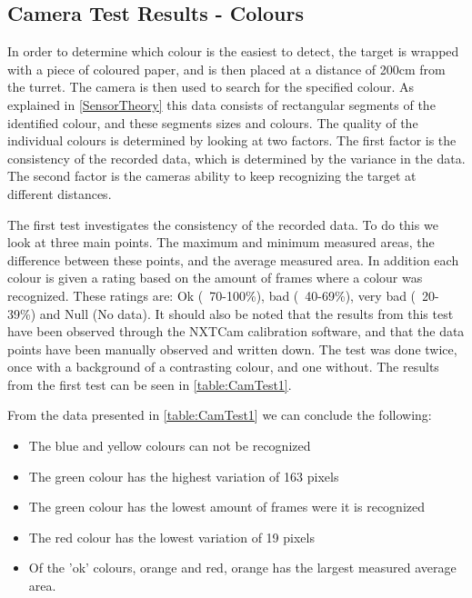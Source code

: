 
\subsection{Camera Test Results - Colours}\label{CamTestColours}
In order to determine which colour is the easiest to detect, the target is
wrapped with a piece of coloured paper, and is then placed at a distance of
200cm from the turret. The camera is then used to search for the specified
colour. As explained in \autoref{SensorTheory} this data consists of rectangular
segments of the identified colour, and these segments sizes and colours. The
quality of the individual colours is determined by looking at two factors. The first factor is
the consistency of the recorded data, which is determined by the variance in the
data. The second factor is the cameras ability to keep recognizing the target
at different distances.\nl

The first test investigates the consistency of the recorded data. To do this we
look at three main points. The maximum and minimum measured areas, the difference
between these points, and the average measured area. In addition each colour is
given a rating based on the amount of frames where a colour was recognized.
These ratings are: Ok (~70-100\%), bad (~40-69\%), very bad (~20-39\%) and Null
(No data). It should also be noted that the results from this test have been
observed through the NXTCam calibration software, and that the data points have
been manually observed and written down. The test was done twice, once with a
background of a contrasting colour, and one without. The results from the first
test can be seen in \autoref{table:CamTest1}.


From the data presented in \autoref{table:CamTest1} we can conclude the
following:
\begin{itemize}
  \item The blue and yellow colours can not be recognized
  \item The green colour has the highest variation of 163 pixels
  \item The green colour has the lowest amount of frames were it is recognized
  \item The red colour has the lowest variation of 19 pixels
  \item Of the 'ok' colours, orange and red, orange has the largest measured
  average area.
\end{itemize} 

